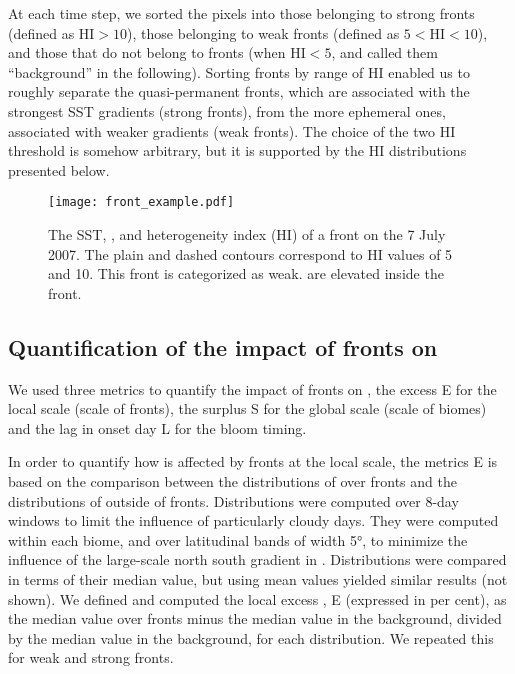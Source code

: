 At each time step, we sorted the pixels into those belonging to strong fronts (defined as \(\mathrm{HI} > 10\)), those belonging to weak fronts (defined as \(5 < \mathrm{HI} < 10\)), and those that do not belong to fronts (when \(\mathrm{HI} < 5\), and called them ``background'' in the following).
Sorting fronts by range of HI enabled us to roughly separate the quasi-permanent fronts, which are associated with the strongest SST gradients (strong fronts), from the more ephemeral ones, associated with weaker gradients (weak fronts).
The choice of the two HI threshold is somehow arbitrary, but it is supported by the HI distributions presented below.


\begin{figure*}
  \texttt{[image: front\_example.pdf]}
  \caption{
    The SST, , and heterogeneity index (HI) of a front on the 7 July 2007.
    The plain and dashed contours correspond to HI values of 5 and 10.
    This front is categorized as weak.
     are elevated inside the front.
  }%
  \label{fig:zoom}
\end{figure*}

\subsection{Quantification of the impact of fronts on }

We used three metrics to quantify the impact of fronts on , the excess   E for the local scale (scale of fronts), the surplus   S for the global scale (scale of biomes) and the lag in onset day L for the bloom timing.

In order to quantify how  is affected by fronts at the local scale, the metrics E is based on the comparison between the distributions of  over fronts and the distributions of  outside of fronts.
Distributions were computed over 8-day windows to limit the influence of particularly cloudy days.
They were computed within each biome, and over latitudinal bands of width 5°, to minimize the influence of the large-scale north south gradient in .
Distributions were compared in terms of their median value, but using mean values yielded similar results (not shown).
We defined and computed the local excess , E (expressed in per cent), as the median value over fronts minus the median value in the background, divided by the median value in the background, for each distribution.
We repeated this for weak and strong fronts.

